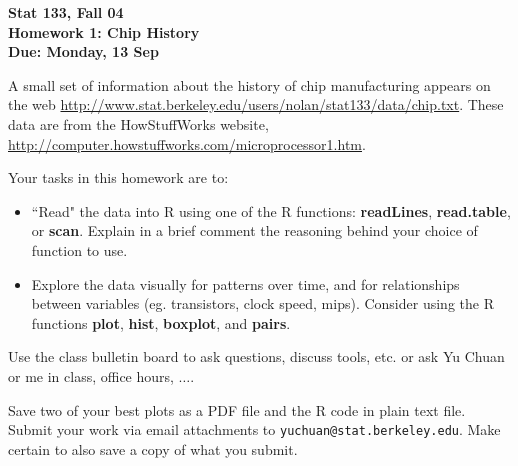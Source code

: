 \documentclass[12pt]{article}
\makeatletter
\def\TA{Yu Chuan}
\def\TAMail{\texttt{yuchuan@stat.berkeley.edu}}
\def\SFunctionRef#1{\textbf{#1}}
\makeatother
\begin{document}
\textbf{Stat 133, Fall 04 \\
Homework 1: Chip History\\
Due:  Monday, 13 Sep}

\medskip

A small set of information about the history of chip manufacturing 
appears on the web 
\url{http://www.stat.berkeley.edu/users/nolan/stat133/data/chip.txt}.
These data are from the HowStuffWorks website,
\url{http://computer.howstuffworks.com/microprocessor1.htm}.

Your tasks in this homework are to:
\begin{itemize}
\item  ``Read" the data into R using one of the R functions:
\SFunctionRef{readLines}, \SFunctionRef{read.table}, or \SFunctionRef{scan}.
Explain in a brief comment the reasoning behind your choice of function to use.

\item Explore the data visually for patterns over time, and for relationships
between variables (eg. transistors, clock speed, mips).
Consider using the R functions
\SFunctionRef{plot}, \SFunctionRef{hist}, \SFunctionRef{boxplot}, and 
\SFunctionRef{pairs}.

\end{itemize}


Use the class bulletin board to ask questions, discuss
tools, etc. or ask \TA{} or me in class, office hours, $\ldots$.

Save two of your best plots as a PDF file and the R code in plain text file. 
Submit your work via email attachments to \TAMail{}.
Make certain to also save a copy of what you submit.

\end{document}
